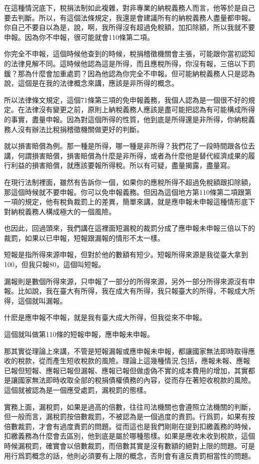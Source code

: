 \documentclass[oneside,sub3section]{ctexbook}
\begin{document}
在這種情況底下，稅捐法制如此複雜，對非專業的納稅義務人而言，他等於是自己要去判斷。所以，有這個法條規定，我還是會建議所有的納稅義務人盡量都申報。你自己不要自以為是，說，啊，我所得沒有超過免稅額，加扣除額，所以我就不要申報。因為你不申報，很可能就會110條第二項。

你完全不申報，這個時候他查到的時候，稅捐稽徵機關會主張，可能跟你當初認知的法律見解不同。這時候他認為這是所得，而且應稅所得，你沒有報，三倍以下罰鍰？那為什麼會加重處罰？因為他認為你完全不申報。但可能納稅義務人只是認為說，這個是在我的法律概念來講，應該是非所得的概念。

所以法律條文規定，這個71條第三項的免申報義務，我個人認為是一個很不好的規定。在法律沒有變更之前，原則上納稅義務人應該是盡可能把認為有可能構成所得的事實，盡量申報。因為對這個所得的性質，他到底是所得還是非所得，你納稅義務人沒有辦法比稅捐稽徵機關做更好的判斷。

就以損害賠償為例。那一種是所得，哪一種是非所得？我們花了一段時間跟各位去講，何謂損害賠償，損害賠償為什麼是非所得，或者為什麼他是替代經濟成果的履行利益的損害賠償，就應該要報所得稅。所以有可疑，盡量揭露，盡量寫。

在現行法制裡面，雖然有告訴你一個，如果你的應稅所得不超過免稅額跟扣除額，那這個時候就不要申報。你可以免申報義務。但因為這個地方第110條第二項跟第一項的規定，他有稅負裁罰上的差異，簡單來講，就是應申報未申報這種情形底下對納稅義務人構成極大的一個風險。

也因此，回過頭來，我們講在這裡面短漏稅的裁罰分成了應申報未申報三倍以下的裁罰，如果以已申報，短報跟漏報的情形不太一樣。

短報是指所得來源申報，但對於他的數額有短少。短報所得來源是我從臺大拿到100，但我只報80，這個叫短報。

漏報則是數個所得來源，只申報了一部分的所得來源，另外一部分所得來源沒有申報。比如說，我在臺大有所得，我在成大有所得，我只報臺大的所得，不報成大所得，這個就叫漏報。

什麽是應申報不申報，就是我有臺大成大所得，但我從來不申報。

這個就叫做第110條的短報申報，應申報未申報。

那其實從理論上來講，不管是短報漏報或應申報未申報，都讓國家無法即時取得應收的稅款，從而產生短收稅款的風險。理論上這幾種情況,包括，應報未報、應報已報但短報、應報已報但漏報、應報已報但做虛偽不實的成本費用的增加，其實都是讓國家無法即時收取全部的稅捐債權債務的內容，從而存在著短收稅款的風險。這個就被認為是一個應受處罰，漏稅罰的態樣。

實務上面，漏稅罰，如果是過高的倍數，往往司法機關也會遵照立法機關的判斷，但一般而言，漏稅罰按倍數裁罰，不被認為是一個過度的責罰。行爲罰，如果有按倍數裁罰，才會有過度責罰的問題。從而這也是我們剛剛在提到扣繳義務的時候，扣繳義務為什麼會去區別，他到底是屬於哪種態樣。如果是應收未收到稅款，這個時候漏稅罰，確實會以倍數裁罰，而倍數其實是沒有數額的絕對上限的問題。可是用行爲罰概念的話，他則必須要有上限的概念，否則會有違反責罰相當性的問題。
\end{document}
